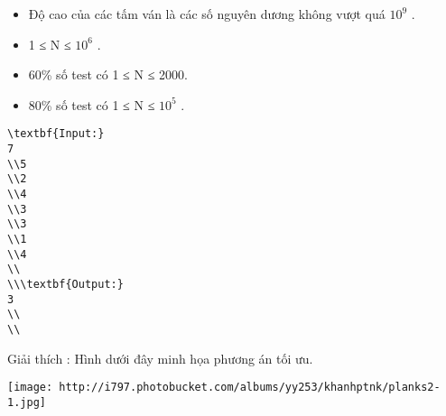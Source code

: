 \begin{itemize}
	\item     Độ cao của các tấm ván là các số nguyên dương không vượt quá $10^{9}$    .   
	\item     1 ≤ N ≤ $10^{6}$    .   
	\item     60\% số test có 1 ≤ N ≤ 2000.   
	\item     80\% số test có 1 ≤ N ≤ $10^{5}$    .   
\end{itemize}
\begin{verbatim}
\textbf{Input:}
7
\\5
\\2
\\4
\\3
\\3
\\1
\\4
\\
\\\textbf{Output:}
3
\\
\\\end{verbatim}

Giải thích        : Hình dưới đây minh họa phương án tối ưu.


\texttt{[image: http://i797.photobucket.com/albums/yy253/khanhptnk/planks2-1.jpg]}